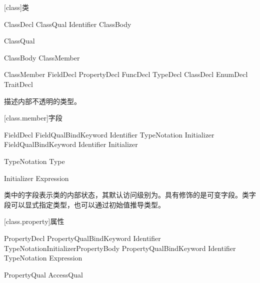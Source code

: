 
[class]{类}

\begin{bnf}{ClassDecl}
    ClassQual\bnfs {} Identifier ClassBody
\end{bnf}

\begin{bnf}{ClassQual}
\end{bnf}

\begin{bnf}{ClassBody}
    \terminal{\{} ClassMember\bnfs \terminal{\}}
\end{bnf}

\begin{bnf}{ClassMember}
    FieldDecl \br
    PropertyDecl \br
    FuncDecl \br
    TypeDecl \br
    ClassDecl \br
    EnumDecl \br
    TraitDecl
\end{bnf}

\pnum
{}描述内部不透明的类型。

[class.member]{字段}

\begin{bnf}{FieldDecl}
    FieldQual\bnfs BindKeyword Identifier TypeNotation Initializer\bnfq \terminal{;}
    FieldQual\bnfs BindKeyword Identifier Initializer \terminal{;}
\end{bnf}

\begin{bnf}{TypeNotation}
    \terminal{:} Type
\end{bnf}

\begin{bnf}{Initializer}
    \terminal{=} Expression
\end{bnf}

\pnum
类中的字段表示类的内部状态，其默认访问级别为。具有修饰的是可变字段。类字段可以显式指定类型，也可以通过初始值推导类型。

[class.property]{属性}

\begin{bnf}{PropertyDecl}
    PropertyQual\bnfs BindKeyword Identifier TypeNotation\bnfq Initializer\bnfq PropertyBody \terminal{;} \br
    PropertyQual\bnfs BindKeyword Identifier TypeNotation\bnfq \terminal{=>} Expression \terminal{;}
\end{bnf}

\begin{bnf}{PropertyQual}
    AccessQual
\end{bnf}

